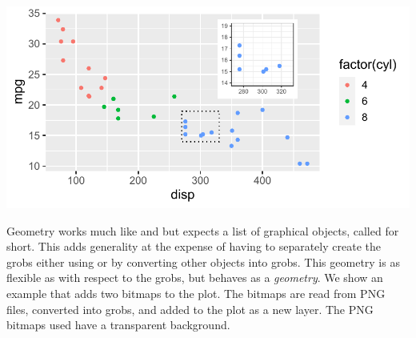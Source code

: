 \documentclass[krantz2]{krantz}\usepackage{knitr}
\begin{document}
\begin{knitrout}
{\centering \includegraphics[width=.7\textwidth]{figure/pos-plot-plot-03-1} 

}



\end{knitrout}
Geometry  works much like  and  but expects a list of  graphical objects, called  for short. This adds generality at the expense of having to separately create the grobs either using  or by converting other objects into grobs. This geometry is as flexible as  with respect to the grobs, but behaves as a \emph{geometry}. We show an example that adds two bitmaps to the plot. The bitmaps are read from PNG files, converted into grobs, and added to the plot as a new layer. The PNG bitmaps used have a transparent background.
\end{document}
